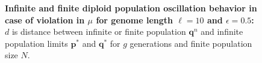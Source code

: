\begin{figure}[H]
\begin{center}
\hspace{5pt}
\hspace{5pt}


\caption{\textbf{Infinite and finite diploid population oscillation behavior in case of violation in $\mu$ for genome length $\ell = 10$ and $\epsilon = 0.5$:} $d$ is
  distance between infinite or finite population ${\bm q}^n$ and infinite
  population limits ${{\bm p}^\ast}$ and ${{\bm q}^{\ast}}$ for $g$ generations and finite population size $N$.}
\label{oscillation_10d_vio_mu_0.5}
\end{center}
\end{figure}




